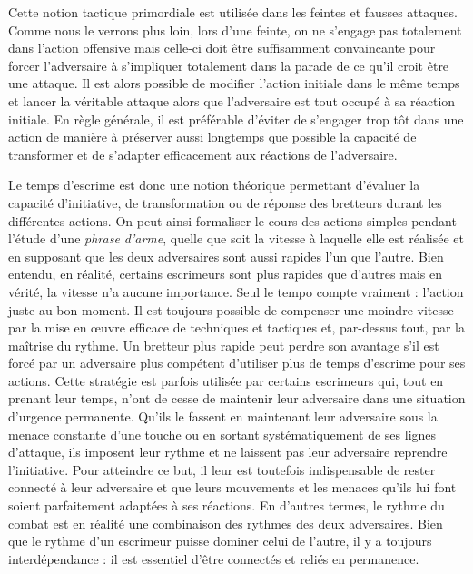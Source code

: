 Cette notion tactique primordiale est utilisée dans les feintes et fausses attaques.
Comme nous le verrons plus loin, lors d'une feinte, on ne s'engage pas totalement dans l'action offensive mais celle-ci doit être suffisamment convaincante pour forcer l'adversaire à s'impliquer totalement dans la parade de ce qu'il croit être une attaque. 
Il est alors possible de modifier l'action initiale dans le même temps et lancer la véritable attaque alors que l'adversaire est tout occupé à sa réaction initiale.
En règle générale, il est préférable d'éviter de s'engager trop tôt dans une action de manière à préserver aussi longtemps que possible la capacité de transformer et de s'adapter efficacement aux réactions de l'adversaire.

Le temps d'escrime est donc une notion théorique permettant d'évaluer la capacité d'initiative, de transformation ou de réponse des bretteurs durant les différentes actions.
On peut ainsi formaliser le cours des actions simples pendant l'étude d'une \emph{phrase d'arme}, quelle que soit la vitesse à laquelle elle est réalisée et en supposant que les deux adversaires sont aussi rapides l'un que l'autre.
Bien entendu, en réalité, certains escrimeurs sont plus rapides que d'autres mais en vérité, la vitesse n'a aucune importance. Seul le tempo compte vraiment : l'action juste au bon moment.  
Il est toujours possible de compenser une moindre vitesse par la mise en \oe{}uvre efficace de techniques et tactiques et, par-dessus tout, par la maîtrise du rythme.
Un bretteur plus rapide peut perdre son avantage s'il est forcé par un adversaire plus compétent d'utiliser plus de temps d'escrime pour ses actions. 
Cette stratégie est parfois utilisée par certains escrimeurs qui, tout en prenant leur temps, n'ont de cesse de maintenir leur adversaire dans une situation d'urgence permanente.
Qu'ils le fassent en maintenant leur adversaire sous la menace constante d'une touche ou en sortant systématiquement de ses lignes d'attaque, ils imposent leur rythme et ne laissent pas leur adversaire reprendre l'initiative.
Pour atteindre ce but, il leur est toutefois indispensable de rester connecté à leur adversaire et que leurs mouvements et les menaces qu'ils lui font soient parfaitement adaptées à ses réactions.
En d'autres termes, le rythme du combat est en réalité une combinaison des rythmes des deux adversaires.
Bien que le rythme d'un escrimeur puisse dominer celui de l'autre, il y a toujours interdépendance : il est essentiel d'être connectés et reliés en permanence.

